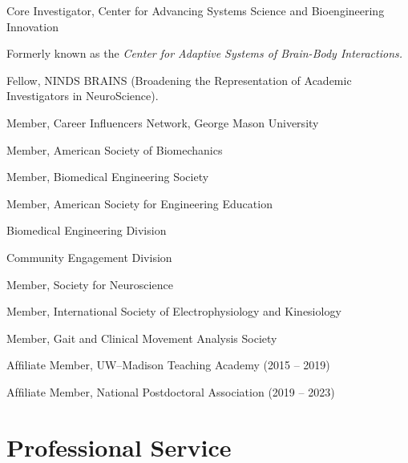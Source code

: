 \documentclass[letterpaper, 10pt]{article}
\begin{document}
\begin{compactitem} %
     \item Core Investigator, Center for Advancing Systems Science and Bioengineering Innovation %
     \begin{compactitem}
	     \begin{footnotesize}
     	     \item[] Formerly known as the \textit{Center for Adaptive Systems of Brain-Body Interactions.}
	     \end{footnotesize}
     \end{compactitem}
     \item Fellow, NINDS BRAINS (Broadening the Representation of Academic Investigators in NeuroScience). %
     \item Member, Career Influencers Network, George Mason University
     \item Member, American Society of Biomechanics %
     \item Member, Biomedical Engineering Society %
     \item Member, American Society for Engineering Education %
          \begin{compactitem}
               \item Biomedical Engineering Division
               \item Community Engagement Division
          \end{compactitem}     
     \item Member, Society for Neuroscience %
     \item Member, International Society of Electrophysiology and Kinesiology %
     \item Member, Gait and Clinical Movement Analysis Society %
     \item Afﬁliate Member, UW--Madison Teaching Academy (2015 -- 2019)
     \item Afﬁliate Member, National Postdoctoral Association (2019 -- 2023)
\end{compactitem} %

\section{Professional Service}
\end{document}
